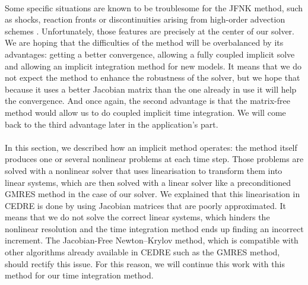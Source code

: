       \paragraph{}
      Some specific situations are known to be troublesome for the JFNK method, such as shocks, reaction fronts or discontinuities arising from high-order advection schemes \cite{KnollKeyes2004}.
      Unfortunately, those features are precisely at the center of our solver.
      We are hoping that the difficulties of the method will be overbalanced by its advantages: getting a better convergence, allowing a fully coupled implicit solve and allowing an implicit integration method for new models.
      It means that we do not expect the method to enhance the robustness of the solver, but we hope that because it uses a better Jacobian matrix than the one already in use it will help the convergence.
      And once again, the second advantage is that the matrix-free method would allow us to do coupled implicit time integration.
      We will come back to the third advantage later in the application's part.


    \paragraph{}
    In this section, we described how an implicit method operates: the method itself produces one or several nonlinear problems at each time step.
    Those problems are solved with a nonlinear solver that uses linearisation to transform them into linear systems, which are then solved with a linear solver like a preconditioned GMRES method in the case of our solver.
    We explained that this linearisation in CEDRE is done by using Jacobian matrices that are poorly approximated.
    It means that we do not solve the correct linear systems, which hinders the nonlinear resolution and the time integration method ends up finding an incorrect increment.
    The Jacobian-Free Newton--Krylov method, which is compatible with other algorithms already available in CEDRE such as the GMRES method,  should rectify this issue.
    For this reason, we will continue this work with this method for our time integration method.
